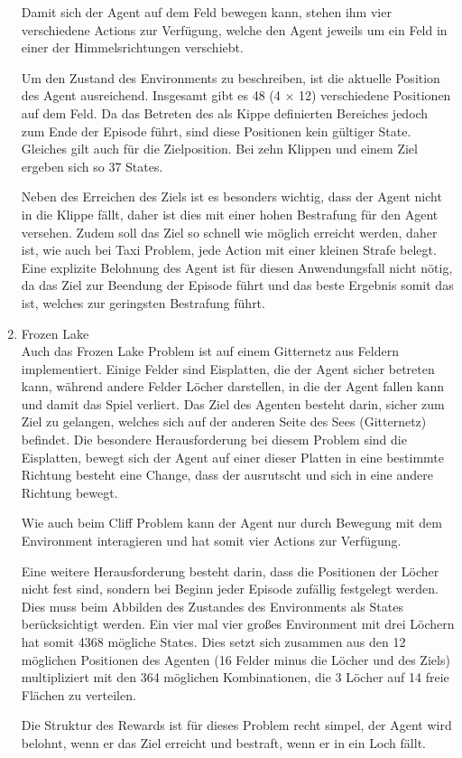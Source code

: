 \begin{enumerate}
    Damit sich der Agent auf dem Feld bewegen kann, stehen ihm vier verschiedene Actions zur Verfügung, welche den Agent jeweils um ein Feld in einer der Himmelsrichtungen verschiebt.

    Um den Zustand des Environments zu beschreiben, ist die aktuelle Position des Agent ausreichend. Insgesamt gibt es 48 (4 × 12) verschiedene Positionen auf dem Feld. Da das Betreten des als Kippe definierten Bereiches jedoch zum Ende der Episode führt, sind diese Positionen kein gültiger State. Gleiches gilt auch für die Zielposition. Bei zehn Klippen und einem Ziel ergeben sich so 37 States.

    Neben des Erreichen des Ziels ist es besonders wichtig, dass der Agent nicht in die Klippe fällt, daher ist dies mit einer hohen Bestrafung für den Agent versehen. Zudem soll das Ziel so schnell wie möglich erreicht werden, daher ist, wie auch bei Taxi Problem, jede Action mit einer kleinen Strafe belegt. Eine explizite Belohnung des Agent ist für diesen Anwendungsfall nicht nötig, da das Ziel zur Beendung der Episode führt und das beste Ergebnis somit das ist, welches zur geringsten Bestrafung führt.

    \item Frozen Lake\\
    Auch das Frozen Lake Problem ist auf einem Gitternetz aus Feldern implementiert. Einige Felder sind Eisplatten, die der Agent sicher betreten kann, während andere Felder Löcher darstellen, in die der Agent fallen kann und damit das Spiel verliert. Das Ziel des Agenten besteht darin, sicher zum Ziel zu gelangen, welches sich auf der anderen Seite des Sees (Gitternetz) befindet. Die besondere Herausforderung bei diesem Problem sind die Eisplatten, bewegt sich der Agent auf einer dieser Platten in eine bestimmte Richtung besteht eine Change, dass der ausrutscht und sich in eine andere Richtung bewegt.

    Wie auch beim Cliff Problem kann der Agent nur durch Bewegung mit dem Environment interagieren und hat somit vier Actions zur Verfügung.

    Eine weitere Herausforderung besteht darin, dass die Positionen der Löcher nicht fest sind, sondern bei Beginn jeder Episode zufällig festgelegt werden. Dies muss beim Abbilden des Zustandes des Environments als States berücksichtigt werden. Ein vier mal vier großes Environment mit drei Löchern hat somit 4368 mögliche States. Dies setzt sich zusammen aus den 12 möglichen Positionen des Agenten (16 Felder minus die Löcher und des Ziels) multipliziert mit den 364 möglichen Kombinationen, die 3 Löcher auf 14 freie Flächen zu verteilen.

    Die Struktur des Rewards ist für dieses Problem recht simpel, der Agent wird belohnt, wenn er das Ziel erreicht und bestraft, wenn er in ein Loch fällt.
    
\end{enumerate}

